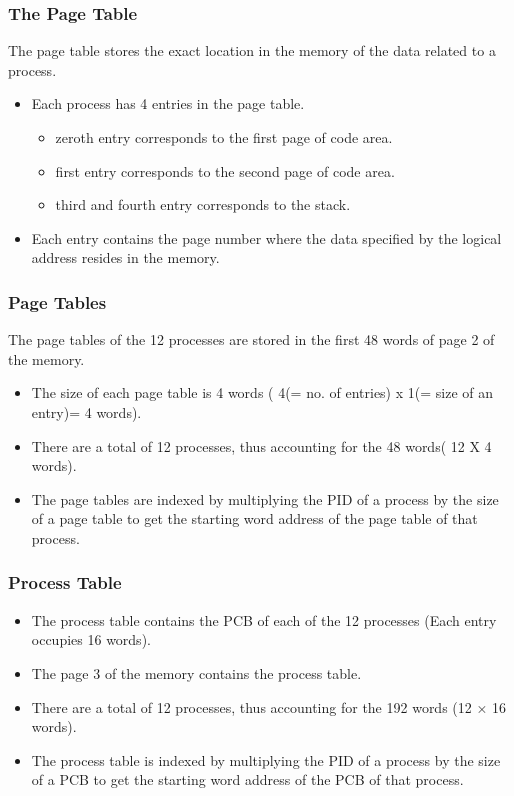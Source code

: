 \documentclass[11pt]{article}
\begin{document}
\subsubsection{The Page Table}
The page table stores the exact location in the memory of the data related to a process.
\begin{itemize}
\item Each process has 4 entries in the page table.
\begin{itemize}
\item zeroth entry corresponds to the first page of code area.
\item first entry corresponds to the second page of code area.
\item third and fourth entry corresponds to the stack.
\end{itemize}
\item Each entry contains the page number where the data specified by the logical address resides in the memory.
\end{itemize}


\subsubsection{Page Tables}
The page tables of the 12 processes are stored in the first 48 words of page 2 of the memory. 
\begin{itemize}
\item The size of each page table is 4 words ( 4(= no. of entries) x 1(= size of an entry)= 4 words).
\item There are a total of 12 processes, thus accounting for the 48 words( 12 X 4 words).
\item The page tables are indexed by multiplying the PID of a process by the size of a page table to get the starting word address of the page table of that process.
\end{itemize}

\subsubsection{Process Table}
\begin{itemize}
\item The process table contains the PCB of each of the 12 processes (Each entry occupies 16 words).
\item The page 3 of the memory contains the process table.
\item There are a total of 12 processes, thus accounting for the 192 words (12 × 16 words).
\item The process table is indexed by multiplying the PID of a process by the size of a PCB to get the starting word address of the PCB of that process.
\end{itemize}
\end{document}
